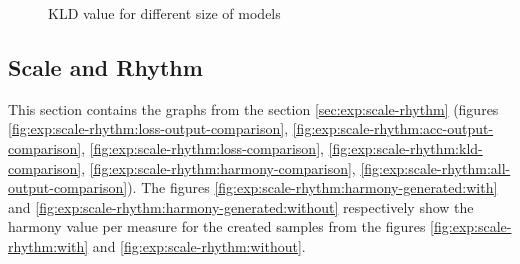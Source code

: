 \documentclass[12pt]{report}
\begin{document}
\begin{figure}[htbp]
\begin{minipage}{0.5 \textwidth}
\begin{center}
            \caption{KLD value for different size of models}
            \label{fig:kld-comparison-size}
        \end{center}
    \end{minipage}
\end{figure}


\subsection{Scale and Rhythm}
\label{appendix:scale-rhythm}

This section contains the graphs from the section \ref{sec:exp:scale-rhythm} (figures \ref{fig:exp:scale-rhythm:loss-output-comparison}, \ref{fig:exp:scale-rhythm:acc-output-comparison}, \ref{fig:exp:scale-rhythm:loss-comparison}, \ref{fig:exp:scale-rhythm:kld-comparison}, \ref{fig:exp:scale-rhythm:harmony-comparison},
\ref{fig:exp:scale-rhythm:all-output-comparison}).
The figures \ref{fig:exp:scale-rhythm:harmony-generated:with} and \ref{fig:exp:scale-rhythm:harmony-generated:without} respectively show the harmony value per measure for the created samples from the figures \ref{fig:exp:scale-rhythm:with} and \ref{fig:exp:scale-rhythm:without}.
\end{document}
